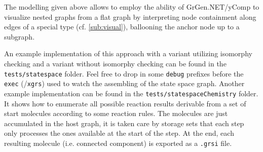 The modelling given above allows to employ the ability of GrGen.NET/yComp to visualize nested graphs from a flat graph by interpreting node containment along edges of a special type (cf. \ref{sub:visual}), ballooning the anchor node up to a subgraph. 

An example implementation of this approach with a variant utilizing isomorphy checking and a variant without isomorphy checking can be found in the \texttt{tests/statespace} folder.
Feel free to drop in some \texttt{debug} prefixes before the \texttt{exec} (/\texttt{xgrs}) used to watch the assembling of the state space graph.
Another example implementation can be found in the \texttt{tests/statespaceChemistry} folder.
It shows how to enumerate all possible reaction results derivable from a set of start molecules according to some reaction rules.
The molecules are just accumulated in the host graph, it is taken care by storage sets that each step only processes the ones available at the start of the step.
At the end, each resulting molecule (i.e. connected component) is exported as a \texttt{.grsi} file.


